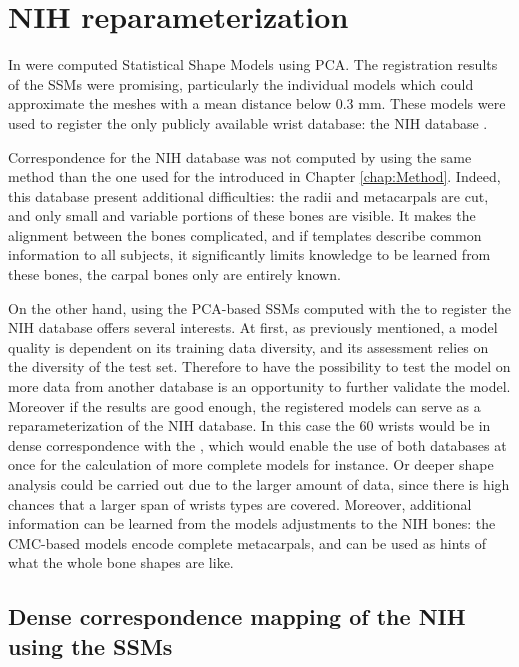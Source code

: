 \section{NIH reparameterization}
\label{sec:5_NIH}


In  were computed Statistical Shape Models using PCA. The registration results of the SSMs were promising, particularly the individual models which could approximate the \db* meshes with a mean distance below $0.3$ mm. These models were used to register the only publicly available wrist database: the NIH database \cite{moore_2007_digital}. 

Correspondence for the NIH database was not computed by using the same method than the one used for the \db* introduced in Chapter \ref{chap:Method}. Indeed, this database present additional difficulties: the radii and metacarpals are cut, and only small and variable portions of these bones are visible. It makes the alignment between the bones complicated, and if templates describe common information to all subjects, it significantly limits knowledge to be learned from these bones, the carpal bones only are entirely known. 

On the other hand, using the PCA-based SSMs computed with the \db* to register the NIH database offers several interests. At first, as previously mentioned, a model quality is dependent on its training data diversity, and its assessment relies on the diversity of the test set. Therefore to have the possibility to test the model on more data from another database is an opportunity to further validate the model. Moreover if the results are good enough, the registered models can serve as a reparameterization of the NIH database. In this case the 60 wrists would be in dense correspondence with the \db*, which would enable the use of both databases at once for the calculation of more complete models for instance. Or deeper shape analysis could be carried out due to the larger amount of data, since there is high chances that a larger span of wrists types are covered. Moreover, additional information can be learned from the models adjustments to the NIH bones: the CMC-based models encode complete metacarpals, and can be used as hints of what the whole bone shapes are like.


\subsection{Dense correspondence mapping of the NIH using the SSMs}

